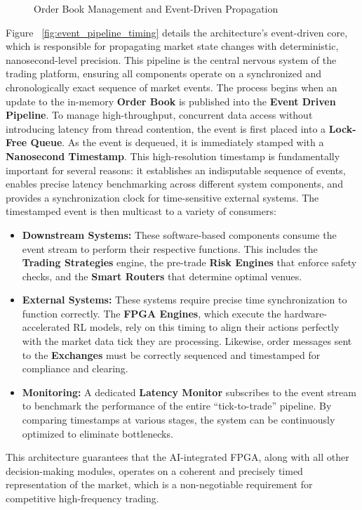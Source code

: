 \begin{figure}
    \centering
    
    \caption{Order Book Management and Event-Driven Propagation}
    \label{fig:order_book_management}
\end{figure}

 Figure ~\ref{fig:event_pipeline_timing} details the architecture's event-driven core, which is responsible for propagating market state changes with deterministic, nanosecond-level precision. This pipeline is the central nervous system of the trading platform, ensuring all components operate on a synchronized and chronologically exact sequence of market events. The process begins when an update to the in-memory \textbf{Order Book} is published into the \textbf{Event Driven Pipeline}. To manage high-throughput, concurrent data access without introducing latency from thread contention, the event is first placed into a \textbf{Lock-Free Queue}. As the event is dequeued, it is immediately stamped with a \textbf{Nanosecond Timestamp}. This high-resolution timestamp is fundamentally important for several reasons: it establishes an indisputable sequence of events, enables precise latency benchmarking across different system components, and provides a synchronization clock for time-sensitive external systems. The timestamped event is then multicast to a variety of consumers: \begin{itemize} 
    \item \textbf{Downstream Systems:} These software-based components consume the event stream to perform their respective functions. This includes the \textbf{Trading Strategies} engine, the pre-trade \textbf{Risk Engines} that enforce safety checks, and the \textbf{Smart Routers} that determine optimal venues. 
    \item \textbf{External Systems:} These systems require precise time synchronization to function correctly. The \textbf{FPGA Engines}, which execute the hardware-accelerated RL models, rely on this timing to align their actions perfectly with the market data tick they are processing. Likewise, order messages sent to the \textbf{Exchanges} must be correctly sequenced and timestamped for compliance and clearing. 
    \item \textbf{Monitoring:} A dedicated \textbf{Latency Monitor} subscribes to the event stream to benchmark the performance of the entire ``tick-to-trade'' pipeline. By comparing timestamps at various stages, the system can be continuously optimized to eliminate bottlenecks. 
\end{itemize} This architecture guarantees that the AI-integrated FPGA, along with all other decision-making modules, operates on a coherent and precisely timed representation of the market, which is a non-negotiable requirement for competitive high-frequency trading.


